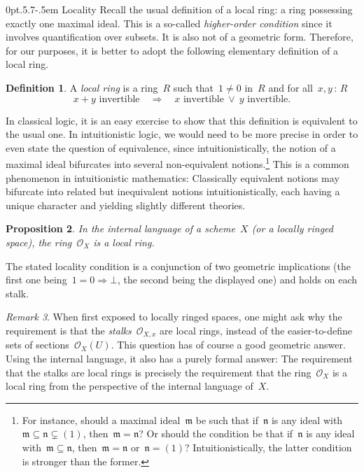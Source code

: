 \documentclass[10pt,reqno,a4paper]{amsbook}
\makeatletter
\theoremstyle{definition}
\newtheorem{defn}{Definition}[section]
\theoremstyle{plain}
\newtheorem{prop}[defn]{Proposition}
\theoremstyle{remark}
\newtheorem{rem}[defn]{Remark}
\renewcommand{\O}{\mathcal{O}}
\newcommand{\mmm}{\mathfrak{m}}
\newcommand{\nnn}{\mathfrak{n}}
\newcommand{\?}{\,{:}\,}
\renewcommand{\_}{\mathpunct{.}\,}
\renewenvironment{proof}[1][\proofname]{\par
  \pushQED{\qed}%
  \normalfont \topsep6\p@\@plus6\p@\relax
  \trivlist
  \item[\hskip\labelsep
        \itshape
    #1\@addpunct{.}]\ignorespaces
}{%
  \popQED\endtrivlist\@endpefalse
}
\def\subsection{\@startsection{subsection}{2}%
  {0pt}{.5\linespacing\@plus.7\linespacing}{-.5em}%
  {\normalfont\bfseries}}
\makeatother
\begin{document}
\subsection{Locality} Recall the usual definition of a local ring: a ring
possessing exactly one maximal ideal. This is a so-called \emph{higher-order
condition} since it involves quantification over subsets. It is also not of a
geometric form. Therefore, for our purposes, it is better to
adopt the following elementary definition of a local ring.
\begin{defn}A \emph{local ring} is a ring~$R$ such that~$1 \neq 0$ in~$R$ and
for all~$x,y \? R$
\[ \text{$x+y$ invertible} \quad\Longrightarrow\quad
  \text{$x$ invertible}\ \vee\ \text{$y$ invertible}. \]
\end{defn}
In classical logic, it is an easy exercise to show that this definition is
equivalent to the usual one. In intuitionistic logic, we would need to be
more precise in order to even state the question of equivalence, since
intuitionistically, the notion of a maximal ideal bifurcates into several
non-equivalent notions.\footnote{For instance, should a maximal ideal~$\mmm$ be
such that if~$\nnn$ is any ideal with~$\mmm \subseteq \nnn \subsetneq (1)$,
then~$\mmm = \nnn$? Or should the condition be that if~$\nnn$ is any ideal
with~$\mmm \subseteq \nnn$, then~$\mmm = \nnn$ or~$\nnn = (1)$?
Intuitionistically, the latter condition is stronger than the former.}
This is a common phenomenon in intuitionistic
mathematics: Classically equivalent notions may bifurcate into related but
inequivalent notions intuitionistically, each having a unique character and
yielding slightly different theories.


\begin{prop}\label{prop:local-ring}
In the internal language of a scheme~$X$ (or a locally ringed
space), the ring~$\O_X$ is a local ring.\end{prop}
\begin{proof}The stated locality condition is a conjunction of two geometric
implications (the first one being~$1 = 0 \Rightarrow \bot$, the second being
the displayed one) and holds on each stalk.\end{proof}

\begin{rem}When first exposed to locally ringed spaces, one might ask why the
requirement is that the \emph{stalks}~$\O_{X,x}$ are local rings, instead of the
easier-to-define sets of sections~$\O_X(U)$. This question has of course a good
geometric answer. Using the internal language, it also has a purely formal
answer: The requirement that the stalks are local rings is precisely the
requirement that the ring~$\O_X$ is a local ring from the perspective of the
internal language of~$X$.
\end{rem}
\end{document}
